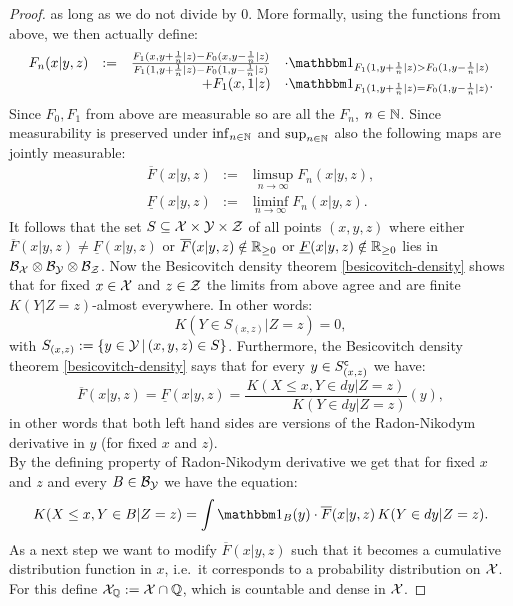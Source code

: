 \begin{Thm}
\begin{proof}
as long as we do not divide by $0$.
More formally, using the functions from above, we then actually define:
$$\begin{array}{rcrl}
F_n(x|y,z)
&:=&  \frac{F_1(x,y+\frac{1}{n}|z) - F_0(x,y-\frac{1}{n}|z) }{F_1(1,y+\frac{1}{n}|z) - F_0(1,y-\frac{1}{n}|z)} &\cdot \I_{ F_1(1,y+\frac{1}{n}|z) > F_0(1,y-\frac{1}{n}|z)}   \\
&& + F_1(x,1|z) &\cdot \I_{ F_1(1,y+\frac{1}{n}|z) = F_0(1,y-\frac{1}{n}|z) }.
\end{array} $$
Since $F_0,F_1$ from above are measurable so are all the $F_n$, $n \in \mathbb{N}$.
Since measurability is preserved under $\inf_{n \in \mathbb{N}}$ and $\sup_{n \in \mathbb{N}}$ also the following maps are jointly measurable:
$$\begin{array}{rcrl}
\overline  F(x|y,z) &:=&  \limsup_{ n \to \infty} F_n(x|y,z), \\
\underline F(x|y,z) &:=&  \liminf_{ n \to \infty} F_n(x|y,z).
\end{array}$$
It follows that the set $S \subseteq \mathcal{X} \times \mathcal{Y} \times \mathcal{Z}$ of all points $(x,y,z)$ where either $\overline  F(x|y,z) \neq \underline  F(x|y,z)$ or $\overline  F(x|y,z) \notin \mathbb{R}_{\ge 0}$ or $\underline  F(x|y,z) \notin \mathbb{R}_{\ge 0}$ lies in 
$\mathcal{B}_{\mathcal{X}} \otimes \mathcal{B}_{\mathcal{Y}} \otimes \mathcal{B}_{\mathcal{Z}}$.
Now the Besicovitch density theorem \ref{besicovitch-density} shows that for fixed $x \in \mathcal{X}$ and $z \in \mathcal{Z}$
the limits from above agree and are finite $K(Y|Z=z)$-almost everywhere. In other words:
$$ K(Y \in S_{(x,z)} | Z=z) =0, $$
with $S_{(x,z)}:=\{ y \in \mathcal{Y} \,|\, (x,y,z) \in S \}$. Furthermore, the Besicovitch density theorem \ref{besicovitch-density} says that for every 
$y \in S_{(x,z)}^{\mathsf{c}}$ we have:
\[\overline  F(x|y,z) = \underline  F(x|y,z) = \frac{K(X \le x, Y \in dy|Z=z)}{\phantom{X \le x,\,}K(Y \in dy|Z=z) }(y), \]
in other words that both left hand sides are versions of the Radon-Nikodym derivative in $y$ (for fixed $x$ and $z$).\\
By the defining property of Radon-Nikodym derivative we get that for fixed $x$ and $z$ and every $B \in \mathcal{B}_{\mathcal{Y}}$ we have the equation:
\[  K(X \le x, Y \in B |Z=z) = \int \I_B(y) \cdot \overline F(x|y,z) \, K(Y \in dy|Z=z).\]
As a next step we want to modify  $\overline F(x|y,z)$ such that it becomes a cumulative distribution function in $x$, i.e.\ it corresponds to a probability distribution on $\mathcal{X}$. 
For this define $\mathcal{X}_{\mathbb{Q}}:= \mathcal{X} \cap \mathbb{Q}$, which is countable and dense in $\mathcal{X}$.

\end{proof}
\end{Thm}
